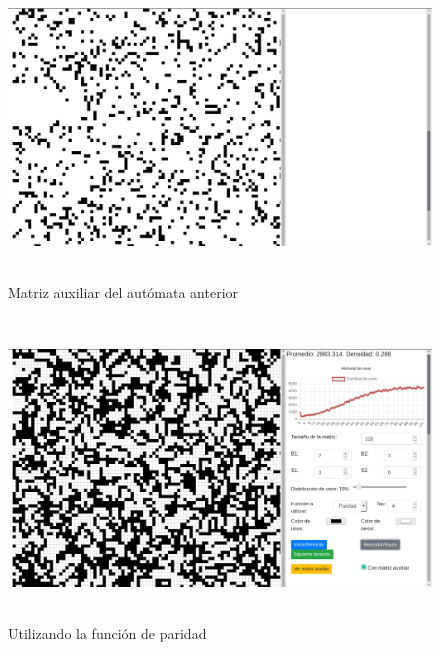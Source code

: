 \documentclass[12pt, titlepage]{article}
\begin{document}
\begin{figure}[H]
\begin{center}
 \includegraphics[width=15cm, height=8cm]{./img/2336-max-aux.png}
 \caption{Matriz auxiliar del autómata anterior}
 \label{fig:2336-max-aux}
\end{center}
\end{figure}

\begin{figure}[H]
\begin{center}
 \includegraphics[width=15cm, height=8cm]{./img/2336-paridad.png}
 \caption{Utilizando la función de paridad}
 \label{fig:2336-paridad}
\end{center}
\end{figure}
\end{document}
